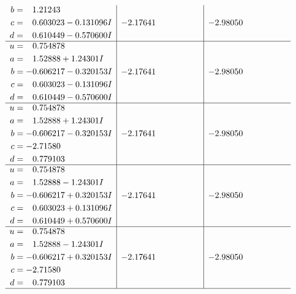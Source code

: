 \documentclass[1p]{elsarticle_modified}
\theoremstyle{definition}
\begin{document}
$$\begin{array}{c|c|c}
\begin{aligned}
b &= \phantom{-}1.21243\phantom{ +0.000000I} \\
c &= \phantom{-}0.603023 - 0.131096 I \\
d &= \phantom{-}0.610449 - 0.570600 I\end{aligned}
 & -2.17641\phantom{ +0.000000I} & -2.98050\phantom{ +0.000000I} \\ \hline\begin{aligned}
u &= \phantom{-}0.754878\phantom{ +0.000000I} \\
a &= \phantom{-}1.52888 + 1.24301 I \\
b &= -0.606217 - 0.320153 I \\
c &= \phantom{-}0.603023 - 0.131096 I \\
d &= \phantom{-}0.610449 - 0.570600 I\end{aligned}
 & -2.17641\phantom{ +0.000000I} & -2.98050\phantom{ +0.000000I} \\ \hline\begin{aligned}
u &= \phantom{-}0.754878\phantom{ +0.000000I} \\
a &= \phantom{-}1.52888 + 1.24301 I \\
b &= -0.606217 - 0.320153 I \\
c &= -2.71580\phantom{ +0.000000I} \\
d &= \phantom{-}0.779103\phantom{ +0.000000I}\end{aligned}
 & -2.17641\phantom{ +0.000000I} & -2.98050\phantom{ +0.000000I} \\ \hline\begin{aligned}
u &= \phantom{-}0.754878\phantom{ +0.000000I} \\
a &= \phantom{-}1.52888 - 1.24301 I \\
b &= -0.606217 + 0.320153 I \\
c &= \phantom{-}0.603023 + 0.131096 I \\
d &= \phantom{-}0.610449 + 0.570600 I\end{aligned}
 & -2.17641\phantom{ +0.000000I} & -2.98050\phantom{ +0.000000I} \\ \hline\begin{aligned}
u &= \phantom{-}0.754878\phantom{ +0.000000I} \\
a &= \phantom{-}1.52888 - 1.24301 I \\
b &= -0.606217 + 0.320153 I \\
c &= -2.71580\phantom{ +0.000000I} \\
d &= \phantom{-}0.779103\phantom{ +0.000000I}\end{aligned}
 & -2.17641\phantom{ +0.000000I} & -2.98050\phantom{ +0.000000I}\\
 \hline 
 \end{array}$$\newpage\newpage\renewcommand{\arraystretch}{1}
\end{document}
